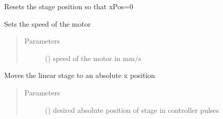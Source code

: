 \documentclass[letterpaper,10pt,english]{sphinxmanual}
\begin{document}
\begin{fulllineitems}
\begin{fulllineitems}
\begin{quote}
\begin{description}
\end{description}\end{quote}

\end{fulllineitems}


\begin{fulllineitems}
\label{\detokenize{source/laboratory.drivers:laboratory.drivers.motor.Motor.reset}}
Resets the stage position so that xPos=0

\end{fulllineitems}


\begin{fulllineitems}
\label{\detokenize{source/laboratory.drivers:laboratory.drivers.motor.Motor.set_speed}}
Sets the speed of the motor
\begin{quote}\begin{description}
\item[{Parameters}] \leavevmode
{} (\sphinxstyleliteralemphasis{\sphinxupquote{, }}) \textendash{} speed of the motor in mm/s

\end{description}\end{quote}

\end{fulllineitems}


\begin{fulllineitems}
\label{\detokenize{source/laboratory.drivers:laboratory.drivers.motor.Motor.set_xpos}}
Moves the linear stage to an absolute x position
\begin{quote}\begin{description}
\item[{Parameters}] \leavevmode
{} (\sphinxstyleliteralemphasis{\sphinxupquote{, }}) \textendash{} desired absolute position of stage in controller pulses


\end{description}
\end{quote}
\end{fulllineitems}
\end{fulllineitems}
\end{document}
